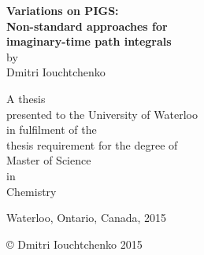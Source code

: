 \documentclass[11pt, twoside, final]{book}
\begin{document}
\frontmatter

\pagestyle{plain}

\begin{titlepage}
\begin{center}

\mbox{}\vfill
\vfill
\vfill
\vfill

{ \LARGE \bfseries
	Variations on PIGS: \\[1 mm]
	Non-standard approaches for \\[1 mm]
	imaginary-time path integrals
} \\[5 mm]

by \\[5 mm]

{ \Large Dmitri Iouchtchenko }

\vfill
\vfill

A thesis \\
presented to the University of Waterloo \\
in fulfilment of the \\
thesis requirement for the degree of \\
Master of Science \\
in \\
Chemistry

\vfill

Waterloo, Ontario, Canada, 2015

\vfill

\copyright{} Dmitri Iouchtchenko 2015

\vfill

\end{center}
\end{titlepage}






\tableofcontents

\renewcommand{\nomname}{List of abbreviations}
\def\nomlabel#1{\hspace{5 mm}\textbf{#1}\hfil}
\printnomenclature[1 in]

\renewcommand{\listfigurename}{List of figures}
\listoffigures

\renewcommand{\listtablename}{List of tables}
\listoftables




\mainmatter

\pagestyle{fancy}







\appendix








\backmatter

\pagestyle{plain}

\printbibliography[title={References}, heading=bibnumbered, sorting=customsort]
\end{document}

